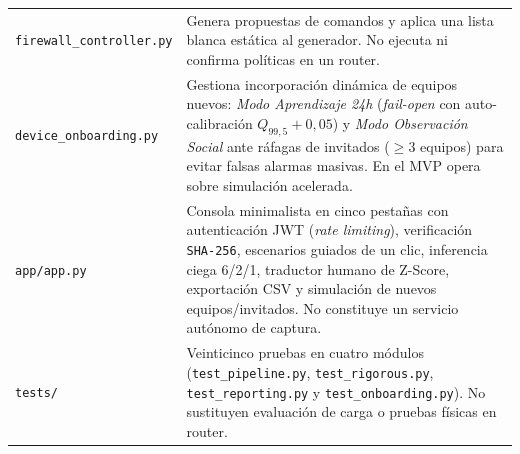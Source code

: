 \documentclass[11pt,a4paper]{article}
\begin{document}
\begin{longtable}{p{}p{}}
\addlinespace
\texttt{firewall\_controller.py} & Genera propuestas de comandos y aplica una lista blanca estática al generador. No ejecuta ni confirma políticas en un router.\\
\addlinespace
\texttt{device\_onboarding.py} & Gestiona incorporación dinámica de equipos nuevos: \textit{Modo Aprendizaje 24h} (\textit{fail-open} con auto-calibración $Q_{99{,}5}+0{,}05$) y \textit{Modo Observación Social} ante ráfagas de invitados ($\ge 3$ equipos) para evitar falsas alarmas masivas. En el MVP opera sobre simulación acelerada.\\
\addlinespace
\texttt{app/app.py} & Consola minimalista en cinco pestañas con autenticación JWT (\textit{rate limiting}), verificación \texttt{SHA-256}, escenarios guiados de un clic, inferencia ciega 6/2/1, traductor humano de Z-Score, exportación CSV y simulación de nuevos equipos/invitados. No constituye un servicio autónomo de captura.\\
\addlinespace
\texttt{tests/} & Veinticinco pruebas en cuatro módulos (\texttt{test\_pipeline.py}, \texttt{test\_rigorous.py}, \texttt{test\_reporting.py} y \texttt{test\_onboarding.py}). No sustituyen evaluación de carga o pruebas físicas en router.\\
\bottomrule
\end{longtable}
\end{document}
